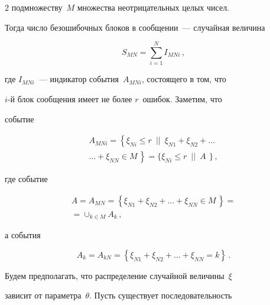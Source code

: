 \begin{multicols}{2}
 подмножеству~$M$ множества неотрицательных целых  чисел.


  Тогда число безошибочных блоков в  сообщении~--- случайная величина





\noindent


$$


S_{MN}=\sum_{i=1}^NI_{MNi}\,,


$$


где $I_{MNi}$~--- индикатор события~$A_{MNi}$, состоящего в том, что


$i$-й блок  сообщения имеет не более $r$~ошибок. Заметим, что


событие





\noindent


\begin{multline*}


A_{MNi}=\left \{\xi_{Ni}\le r\,\,\, \vert |\,\,\, \xi_{N1}+\xi_{N2}+ \dots {}\right.\\


\left.{}\dots +\xi_{NN}\in


M\, \right \}=\{\xi_{Ni}\le r\,\,\, \vert |\,\,\, A\,\ \}\,,


\end{multline*}


где событие





\noindent


\begin{multline*}


A= A_{MN}=\left\{\xi_{N1}+\xi_{N2}+ \dots +\xi_{NN}\in


M\, \right\}={}\\


{}=\cup_{k\in M}A_k\,,


\end{multline*}


а события




$$ A_{k}=A_{kN}=\left\{ \xi_{N1}+\xi_{N2}+ \dots +\xi_{NN}=k\right\}\,.


$$





Будем предполагать, что распределение случайной величины~$\xi$


зависит от параметра~$\theta$. Пусть существует последовательность



\end{multicols}
